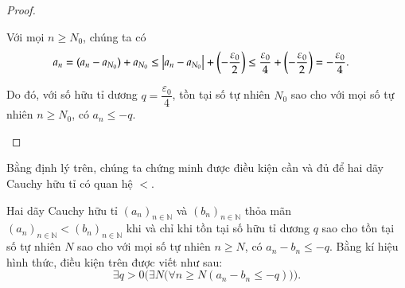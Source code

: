\begin{proof}
\begin{enumerate}[label={\textbf{Khả năng \arabic*.}},itemindent=2cm]
              Với mọi $n\geq N_{0}$, chúng ta có
              \begin{align*}
                  a_{n} & = (a_{n} - a_{N_{0}}) + a_{N_{0}} \leq \left\vert{a_{n} - a_{N_{0}}}\right\vert + \left(-\frac{\varepsilon_{0}}{2}\right) \leq \frac{\varepsilon_{0}}{4} + \left(-\frac{\varepsilon_{0}}{2}\right) = -\frac{\varepsilon_{0}}{4}.
              \end{align*}

              Do đó, với số hữu tỉ dương $q = \dfrac{\varepsilon_{0}}{4}$, tồn tại số tự nhiên $N_{0}$ sao cho với mọi số tự nhiên $n\geq N_{0}$, có $a_{n}\leq -q$.
    \end{enumerate}
\end{proof}

Bằng định lý trên, chúng ta chứng minh được điều kiện cần và đủ để hai dãy Cauchy hữu tỉ có quan hệ $<$.

\begin{theorem}\label{theorem:strictly-precedence-cauchy-sequence}
    Hai dãy Cauchy hữu tỉ ${(a_{n})}_{n\in\mathbb{N}}$ và ${(b_{n})}_{n\in\mathbb{N}}$ thỏa mãn ${(a_{n})}_{n\in\mathbb{N}} < {(b_{n})}_{n\in\mathbb{N}}$ khi và chỉ khi tồn tại số hữu tỉ dương $q$ sao cho tồn tại số tự nhiên $N$ sao cho với mọi số tự nhiên $n\geq N$, có $a_{n} - b_{n}\leq -q$. Bằng kí hiệu hình thức, điều kiện trên được viết như sau:
    \[
        \exists q > 0 \Biggl( \exists N \bigl( \forall n\geq N (a_{n} - b_{n}\leq -q) \bigr) \Biggr).
    \]
\end{theorem}

